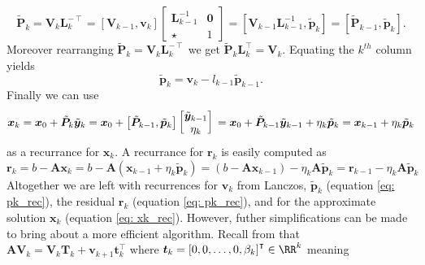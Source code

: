 \[
    \tilde{\bm{P}}_{k} = \bm{V}_{k} \bm{L}_k^{-\intercal} = \left[ \bm{V}_{k-1} , \bm{v}_k \right]
    \begin{bmatrix}
        \bm{L}_{k-1}^{-1} & \bm{0} \\
        \star             & 1
    \end{bmatrix}
    = \left[ \bm{V}_{k-1} \bm{L}_{k-1}^{-1} , \tilde{\bm{p}}_{k} \right]
    = \left[ \tilde{\bm{P}}_{k-1} , \tilde{\bm{p}}_{k} \right].
\]
Moreover rearranging $\tilde{\bm{P}}_{k} = \bm{V}_{k} \bm{L}_k^{-\intercal}$ we get $\tilde{\bm{P}}_{k} \bm{L}_k^{\intercal} = \bm{V}_{k}$. Equating the $k^{th}$ column yields
\begin{equation} \label{eq: pk_rec}
    \tilde{\bm{p}}_{k} = \bm{v}_k - l_{k-1} \tilde{\bm{p}}_{k-1}.
\end{equation}
Finally we can use
\begin{equation} \label{eq: xk_rec}
    \bm{x}_k = \bm{x}_0 + \tilde{\bm{P}}_{k} \tilde{\bm{y}}_{k}                                 \\
    = \bm{x}_0 + \left[ \tilde{\bm{P}}_{k-1} , \tilde{\bm{p}}_{k} \right]
    \begin{bmatrix}
        \tilde{\bm{y}}_{k-1} \\
        \eta_k
    \end{bmatrix}                                                                    \\
    = \bm{x}_0 + \tilde{\bm{P}}_{k-1} \tilde{\bm{y}}_{k-1} + \eta_k \tilde{\bm{p}}_{k} \\
    = \bm{x}_{k-1} + \eta_k \tilde{\bm{p}}_{k}
\end{equation}
as a recurrance for $\bm{x}_k$. A recurrance for $\bm{r}_k$ is easily computed as
\begin{equation} \label{eq: rk_rec}
    \bm{r}_{k} = b - \bm{A} \bm{x}_k = b - \bm{A} \left( \bm{x}_{k-1} + \eta_k \tilde{\bm{p}}_{k} \right) = \left( b - \bm{A} \bm{x}_{k-1} \right) - \eta_k \bm{A} \tilde{\bm{p}}_{k} = \bm{r}_{k-1} - \eta_k \bm{A} \tilde{\bm{p}}_{k}
\end{equation}
Altogether we are left with recurrences for $\bm{v}_k$ from Lanczos, $\tilde{\bm{p}}_{k}$ (equation \ref{eq: pk_rec}), the residual $\bm{r}_k$ (equation \ref{eq: pk_rec}),  and for the approximate solution $\bm{x}_k$ (equation \ref{eq: xk_rec}). However, futher simplifications can be made to bring about a more efficient algorithm. Recall from  that $\bm{A} \bm{V}_{k} =  \bm{V}_{k} \bm{T}_k + \bm{v}_{k+1} \bm{t}_{k}^{\intercal}$ where $\bm{t}_k = \left[ 0,0, \ldots , 0, \beta_k \right]^{\intercal} \in \RR^k$ meaning
